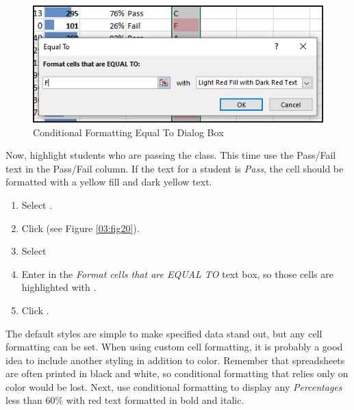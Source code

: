 \begin{figure}[H]
	\centering
	\includegraphics[width=\maxwidth{.95\linewidth}]{gfx/ch03_fig21}
	\caption{Conditional Formatting Equal To Dialog Box}
	\label{03:fig21}
\end{figure}

Now, highlight students who are passing the class. This time use the Pass/Fail text in the Pass/Fail column. If the text for a student is \textit{Pass}, the cell should be formatted with a yellow fill and dark yellow text.

\begin{enumbox}
	\begin{enumerate}
		\item Select .
		\item Click  (see Figure \ref{03:fig20}).
		\item Select 
		\item Enter  in the \textit{Format cells that are EQUAL TO} text box, so those cells are highlighted with .
		\item Click .
	\end{enumerate}
\end{enumbox}
	
The default styles are simple to make specified data stand out, but any cell formatting can be set. When using custom cell formatting, it is probably a good idea to include another styling in addition to color. Remember that spreadsheets are often printed in black and white, so conditional formatting that relies only on color would be lost. Next, use conditional formatting to display any \textit{Percentages} less than $ 60\% $ with red text formatted in bold and italic.


